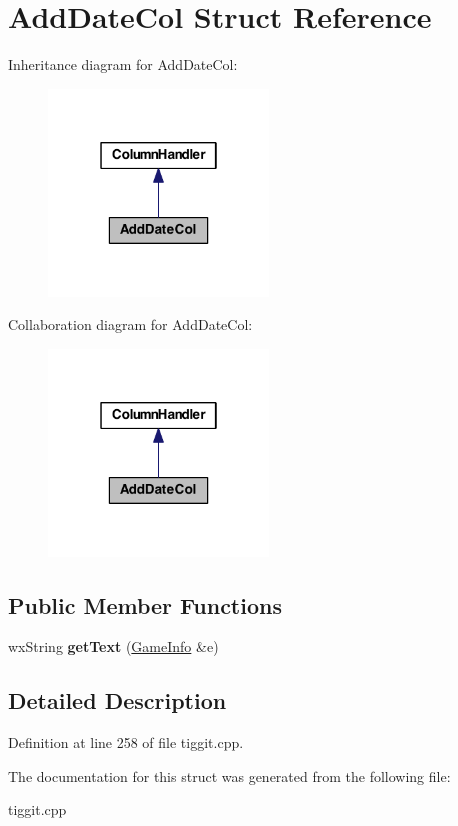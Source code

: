 \hypertarget{struct_add_date_col}{\section{Add\-Date\-Col Struct Reference}
\label{struct_add_date_col}
}


Inheritance diagram for Add\-Date\-Col\-:
\nopagebreak
\begin{figure}[H]
\begin{center}
\leavevmode
\includegraphics[width=166pt]{struct_add_date_col__inherit__graph}
\end{center}
\end{figure}


Collaboration diagram for Add\-Date\-Col\-:
\nopagebreak
\begin{figure}[H]
\begin{center}
\leavevmode
\includegraphics[width=166pt]{struct_add_date_col__coll__graph}
\end{center}
\end{figure}
\subsection*{Public Member Functions}
\begin{DoxyCompactItemize}
\item 
\hypertarget{struct_add_date_col_a57c915272f4093784ede43e57b129983}{wx\-String {\bfseries get\-Text} (\hyperlink{struct_game_info}{Game\-Info} \&e)}\label{struct_add_date_col_a57c915272f4093784ede43e57b129983}

\end{DoxyCompactItemize}


\subsection{Detailed Description}


Definition at line 258 of file tiggit.\-cpp.



The documentation for this struct was generated from the following file\-:\begin{DoxyCompactItemize}
\item 
tiggit.\-cpp\end{DoxyCompactItemize}
